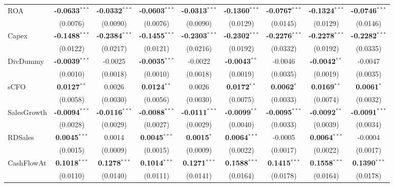 \documentclass[11pt,a4paper]{article}
\begin{document}
\begin{table}[htbp]
\begin{tabular}{lcccccccc}
ROA & \textbf{-0.0633}$^{***}$ & \textbf{-0.0332}$^{***}$ & \textbf{-0.0603}$^{***}$ & \textbf{-0.0313}$^{***}$ & \textbf{-0.1360}$^{***}$ & \textbf{-0.0767}$^{***}$ & \textbf{-0.1324}$^{***}$ & \textbf{-0.0746}$^{***}$ \\
 & (0.0076) & (0.0090) & (0.0076) & (0.0090) & (0.0129) & (0.0145) & (0.0129) & (0.0146) \\
Capex & \textbf{-0.1488}$^{***}$ & \textbf{-0.2384}$^{***}$ & \textbf{-0.1455}$^{***}$ & \textbf{-0.2303}$^{***}$ & \textbf{-0.2302}$^{***}$ & \textbf{-0.2276}$^{***}$ & \textbf{-0.2278}$^{***}$ & \textbf{-0.2282}$^{***}$ \\
 & (0.0122) & (0.0217) & (0.0121) & (0.0216) & (0.0192) & (0.0332) & (0.0192) & (0.0335) \\
DivDummy & \textbf{-0.0039}$^{***}$ & -0.0025 & \textbf{-0.0035}$^{***}$ & -0.0022 & \textbf{-0.0043}$^{**}$ & -0.0046 & \textbf{-0.0042}$^{**}$ & -0.0047 \\
 & (0.0010) & (0.0018) & (0.0010) & (0.0018) & (0.0019) & (0.0035) & (0.0019) & (0.0035) \\
sCFO & \textbf{0.0127}$^{**}$ & 0.0026 & \textbf{0.0124}$^{**}$ & 0.0026 & \textbf{0.0172}$^{**}$ & \textbf{0.0062}$^{*}$ & \textbf{0.0169}$^{**}$ & \textbf{0.0061}$^{*}$ \\
 & (0.0058) & (0.0030) & (0.0056) & (0.0030) & (0.0075) & (0.0033) & (0.0074) & (0.0032) \\
SalesGrowth & \textbf{-0.0094}$^{***}$ & \textbf{-0.0116}$^{***}$ & \textbf{-0.0088}$^{***}$ & \textbf{-0.0111}$^{***}$ & \textbf{-0.0099}$^{**}$ & \textbf{-0.0095}$^{***}$ & \textbf{-0.0092}$^{**}$ & \textbf{-0.0091}$^{***}$ \\
 & (0.0028) & (0.0029) & (0.0027) & (0.0029) & (0.0040) & (0.0033) & (0.0039) & (0.0034) \\
RDSales & \textbf{0.0045}$^{***}$ & 0.0014 & \textbf{0.0045}$^{***}$ & \textbf{0.0015}$^{*}$ & \textbf{0.0064}$^{***}$ & -0.0005 & \textbf{0.0064}$^{***}$ & -0.0004 \\
 & (0.0015) & (0.0009) & (0.0015) & (0.0009) & (0.0022) & (0.0017) & (0.0022) & (0.0017) \\
CashFlowAt & \textbf{0.1018}$^{***}$ & \textbf{0.1278}$^{***}$ & \textbf{0.1014}$^{***}$ & \textbf{0.1271}$^{***}$ & \textbf{0.1588}$^{***}$ & \textbf{0.1415}$^{***}$ & \textbf{0.1558}$^{***}$ & \textbf{0.1390}$^{***}$ \\
 & (0.0110) & (0.0140) & (0.0111) & (0.0141) & (0.0164) & (0.0178) & (0.0164) & (0.0178) \\

\end{tabular}
\end{table}
\end{document}
